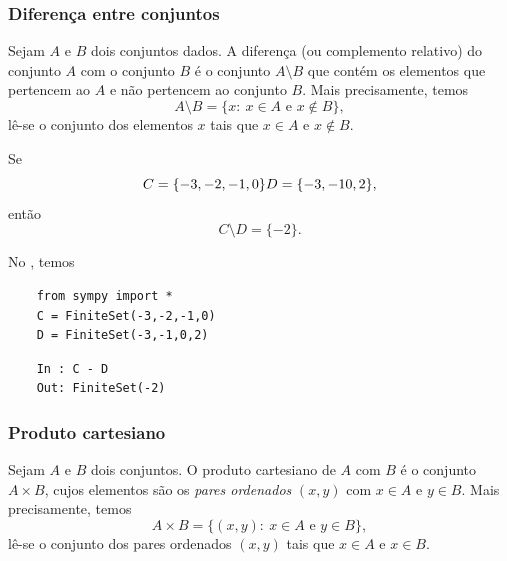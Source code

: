 \subsubsection{Diferença entre conjuntos}

Sejam $A$ e $B$ dois conjuntos dados. A diferença (ou complemento relativo) do conjunto $A$ com o conjunto $B$ é o conjunto $A\setminus B$ que contém os elementos que pertencem ao $A$ e não pertencem ao conjunto $B$. Mais precisamente, temos
\begin{equation}
  A\setminus B = \{x:~x\in A \text{ e } x\not\in B\},
\end{equation}
lê-se o conjunto dos elementos $x$ tais que $x\in A$ e $x\not\in B$.

\begin{ex}
  Se
  \begin{equation}
    C = \{-3, -2, -1, 0\}\\
    D = \{-3, -1 0, 2\},
  \end{equation}
  então
  \begin{equation}
    C\setminus D = \{-2\}.
  \end{equation}

  \ifispython
  No \python, temos
  \begin{lstlisting}
    from sympy import *
    C = FiniteSet(-3,-2,-1,0)
    D = FiniteSet(-3,-1,0,2)
  \end{lstlisting}
  \begin{lstlisting}
    In : C - D
    Out: FiniteSet(-2)
  \end{lstlisting}
  \fi
\end{ex}

\subsubsection{Produto cartesiano}

Sejam $A$ e $B$ dois conjuntos. O produto cartesiano de $A$ com $B$ é o conjunto $A\times B$, cujos elementos são os \emph{pares ordenados} $(x, y)$ com $x\in A$ e $y\in B$. Mais precisamente, temos
\begin{equation}
  A\times B = \{(x, y):~x\in A \text{ e } y\in B\},
\end{equation}
lê-se o conjunto dos pares ordenados $(x, y)$ tais que $x\in A$ e $x\in B$.

